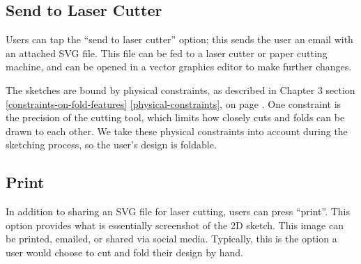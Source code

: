 \subsection{Send to Laser Cutter}\label{send-to-laser-cutter}

Users can tap the ``send to laser cutter'' option; this sends the user
an email with an attached SVG file. This file can be fed to a laser
cutter or paper cutting machine, and can be opened in a vector graphics
editor to make further changes.

The sketches are bound by physical constraints, as described in Chapter
3 section \ref{constraints-on-fold-features} \ref{physical-constraints},
 on page \pageref{physical-constraints}.
One constraint is the precision of the cutting tool, which limits how
closely cuts and folds can be drawn to each other. We take these
physical constraints into account during the sketching process, so the
user's design is foldable.

\subsection{Print}\label{print}

In addition to sharing an SVG file for laser cutting, users can press
``print''. This option provides what is essentially screenshot of the 2D
sketch. This image can be printed, emailed, or shared via social media.
Typically, this is the option a user would choose to cut and fold their
design by hand.


